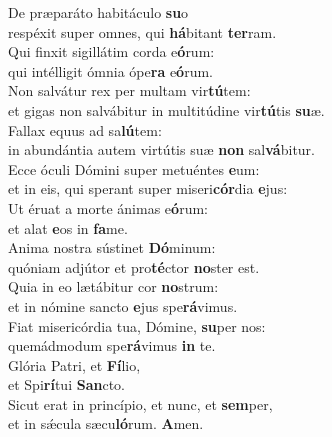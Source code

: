 \evenverse De præparáto habitáculo \textbf{su}o~\*\\
\evenverse respéxit super omnes, qui \textbf{há}bitant \textbf{ter}ram.\\
\oddverse Qui finxit sigillátim corda e\textbf{ó}rum:~\*\\
\oddverse qui intélligit ómnia ópe\textbf{ra} e\textbf{ó}rum.\\
\evenverse Non salvátur rex per multam vir\textbf{tú}tem:~\*\\
\evenverse et gigas non salvábitur in multitúdine vir\textbf{tú}tis \textbf{su}æ.\\
\oddverse Fallax equus ad sa\textbf{lú}tem:~\*\\
\oddverse in abundántia autem virtútis suæ \textbf{non} sal\textbf{vá}bitur.\\
\evenverse Ecce óculi Dómini super metuéntes \textbf{e}um:~\*\\
\evenverse et in eis, qui sperant super miseri\textbf{cór}dia \textbf{e}jus:\\
\oddverse Ut éruat a morte ánimas e\textbf{ó}rum:~\*\\
\oddverse et alat \textbf{e}os in \textbf{fa}me.\\
\evenverse Anima nostra sústinet \textbf{Dó}minum:~\*\\
\evenverse quóniam adjútor et pro\textbf{té}ctor \textbf{no}ster est.\\
\oddverse Quia in eo lætábitur cor \textbf{no}strum:~\*\\
\oddverse et in nómine sancto \textbf{e}jus spe\textbf{rá}vimus.\\
\evenverse Fiat misericórdia tua, Dómine, \textbf{su}per nos:~\*\\
\evenverse quemádmodum spe\textbf{rá}vimus \textbf{in} te.\\
\oddverse Glória Patri, et \textbf{Fí}lio,~\*\\
\oddverse et Spi\textbf{rí}tui \textbf{San}cto.\\
\evenverse Sicut erat in princípio, et nunc, et \textbf{sem}per,~\*\\
\evenverse et in sǽcula sæcu\textbf{ló}rum. \textbf{A}men.\\

